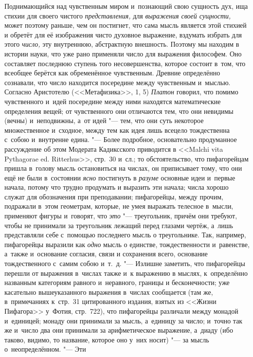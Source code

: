 Поднимающийся над чувственным миром и~познающий свою сущность дух, ища стихии
для своего чистого {\em представления,} для {\em выражения своей сущности,}
может поэтому раньше, чем он постигнет, что сама мысль является этой стихией и
обретёт для её изображения чисто духовное выражение, вздумать избрать для этого
{\em число,} эту внутреннюю, абстрактную внешность. Поэтому мы находим в
истории науки, что уже рано применяли число для выражения философем. Оно
составляет последнюю ступень того несовершенства, которое состоит в~том, что
всеобщее берётся как обременённое чувственным. Древние определённо сознавали,
что число находится посередине между чувственным и~мыслью. Согласно Аристотелю
(<<Метафизика>>, 1, 5) {\em Платон} говорил, что помимо чувственного и~идей
посередине между ними находятся математические определения вещей; от
чувственного они отличаются тем, что они невидимы (вечны) и~неподвижны, а~от
идей "--- тем, что они суть некоторое множественное и~сходное, между тем как
идея лишь всецело тождественна с~собою и~внутренне едина. "--- Более
подробное, основательно продуманное рассуждение об этом Модерата Кадиксского
приводится в <<Malchi vita Pythagorae ed. Ritterhus>>, стр.~30 и~сл.; то
обстоятельство, что пифагорейцам пришла в~голову мысль остановиться на числах,
он приписывает тому, что они ещё не были в~состоянии {\em ясно} постигнуть в
{\em разуме} основные идеи и~первые начала, потому что трудно продумать и
выразить эти начала; числа хорошо служат для обозначения при преподавании;
пифагорейцы, между прочим, подражали в~этом геометрам, которые, не умея
выражать телесное в~мысли, применяют фигуры и~говорят, что {\em это} "---
треугольник, причём они требуют, чтобы не принимали за треугольник лежащий
перед глазами чертёж, а~лишь представляли себе с~помощью последнего мысль о
треугольнике. Так, например, пифагорейцы выразили как {\em одно} мысль о
единстве, тождественности и~равенстве, а~также и~основание согласия, связи и
сохранения всего, основание тождественного с~самим собою и~т.~д. "--- Излишне
заметить, что пифагорейцы перешли от выражения в~числах также и~к выражению в
мыслях, к~определённо названным категориям равного и~неравного, границы и
бесконечности; уже касательно вышеуказанного выражения в~числах сообщается (там
же, в~примечаниях к~стр.~31 цитированного издания, взятых из <<Жизни Пифагора>>
у~Фотия, стр.~722), что пифагорейцы различали между монадой и~единицей; монаду
они принимали за мысль, а~единицу за число; и~точно так же и~число два они
принимали за арифметическое выражение, а~диаду (ибо таково, видимо, то
название, которое оно у~них носит) "--- за мысль о~неопределённом. "--- Эти
